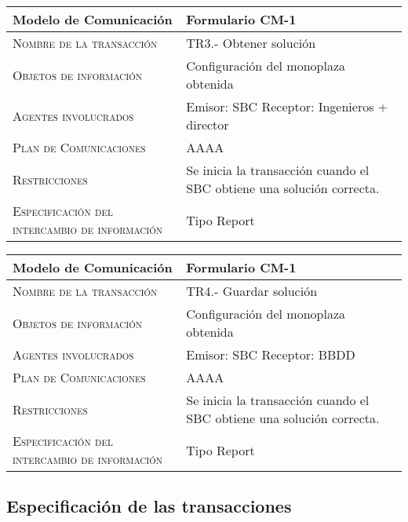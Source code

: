 \documentclass[12pt,a4paper,twoside,spanish]{article}      %
\begin{document}
\begin{table}[H]
\scriptsize
\begin{tabularx}{\textwidth}{|l|X|} \hline
\textbf{Modelo de Comunicación} & \textbf{Formulario CM-1} \\ \hline\hline

\textsc{Nombre de la transacción} & TR3.- Obtener solución

\\ \hline
\textsc{Objetos de información} & Configuración del monoplaza obtenida
\\ \hline
\textsc{Agentes involucrados} &  Emisor: SBC
                                 Receptor: Ingenieros + director \\ \hline
\textsc{Plan de Comunicaciones} &  AAAA
\\ \hline
\textsc{Restricciones} &  Se inicia la transacción cuando el SBC obtiene una solución correcta. \\ \hline
\textsc{Especificación del intercambio de información} &  Tipo Report\\ \hline
\end{tabularx}
  \label{tab.CM1_3}
\end{table}

\begin{table}[H]
\scriptsize
\begin{tabularx}{\textwidth}{|l|X|} \hline
\textbf{Modelo de Comunicación} & \textbf{Formulario CM-1} \\ \hline\hline

\textsc{Nombre de la transacción} & TR4.- Guardar solución

\\ \hline
\textsc{Objetos de información} & Configuración del monoplaza obtenida
\\ \hline
\textsc{Agentes involucrados} &  Emisor: SBC
                                 Receptor: BBDD \\ \hline
\textsc{Plan de Comunicaciones} &  AAAA
\\ \hline
\textsc{Restricciones} &  Se inicia la transacción cuando el SBC obtiene una solución correcta. \\ \hline
\textsc{Especificación del intercambio de información} &  Tipo Report\\ \hline
\end{tabularx}
  \label{tab.CM1_2}
\end{table}
\subsection{Especificación de las transacciones}
\end{document}
